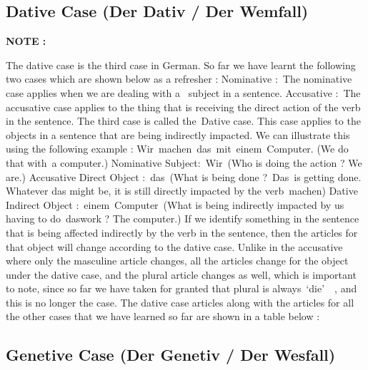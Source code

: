 \documentclass[a4paper,12pt]{article}
\begin{document}
\subsection{\bf{Dative Case (Der Dativ / Der Wemfall)}}
\begin{adjustwidth}{2em}{0pt}
\label{sec:dative_case_dativ_wemfall_}



\end{adjustwidth}


\vspace{0.25cm}
\color{flame} \textbf {NOTE :} \color{black} 


The dative case is the third case in German. So far we have learnt the following
two cases which are shown below as a refresher :
Nominative : The nominative case applies when we are dealing with a  subject in
a sentence.
Accusative : The accusative case applies to the thing that is receiving the
direct action of the verb in the sentence.
The third case is called the Dative case. This case applies to the objects in a
sentence that are being indirectly impacted. We can illustrate this using the
following example :
Wir machen das mit einem Computer.
(We do that with a computer.)
Nominative Subject: Wir (Who is doing the action ? We are.)
Accusative Direct Object : das (What is being done ? Das is getting done.
Whatever das might be, it is still directly impacted by the verb machen)
Dative Indirect Object : einem Computer (What is being indirectly impacted by us
having to do daswork ? The computer.)
If we identify something in the sentence that is being affected indirectly by
the verb in the sentence, then the articles for that object will change
according to the dative case. Unlike in the accusative where only the masculine
article changes, all the articles change for the object under the dative case,
and the plural article changes as well, which is important to note, since so far
we have taken for granted that plural is always ‘die’  , and this is no longer
the case. The dative case articles along with the articles for all the other
cases that we have learned so far are shown in a table below :



\subsection{\bf{Genetive Case (Der Genetiv / Der Wesfall)}}
\begin{adjustwidth}{2em}{0pt}
\label{sec:genetive_case_der_genetiv_der_wesfall_}



\end{adjustwidth}
\end{document}
